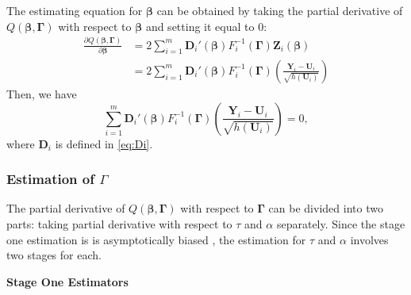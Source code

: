 \documentclass[
]{aft}
\begin{document}
The estimating equation for \(\boldsymbol{\beta}\) can be obtained by
taking the partial derivative of
\(Q(\boldsymbol{\beta}, \boldsymbol{\Gamma})\) with respect to
\(\boldsymbol{\beta}\) and setting it equal to 0: \[
\begin{aligned}
\frac{\partial Q(\boldsymbol{\beta}, \boldsymbol{\Gamma})}{\partial \boldsymbol{\beta}} &= 2 \sum_{i=1}^m \boldsymbol{D}_i'(\boldsymbol{\beta})F_i^{-1}(\boldsymbol{\Gamma})\boldsymbol{Z}_i(\boldsymbol{\beta})\\
&= 2\sum_{i=1}^m \boldsymbol{D}_i'(\boldsymbol{\beta})F_i^{-1}(\boldsymbol{\Gamma})\left(\frac{\boldsymbol{Y}_i - \boldsymbol{U}_i}{\sqrt{h(\boldsymbol{U}_i)}}\right)
\end{aligned}
\] Then, we have \begin{equation}
\sum_{i=1}^m \boldsymbol{D}_i'(\boldsymbol{\beta})F_i^{-1}(\boldsymbol{\Gamma})\left(\frac{\boldsymbol{Y}_i - \boldsymbol{U}_i}{\sqrt{h(\boldsymbol{U}_i)}}\right) = 0, \label{eq:qlsdQdb}
\end{equation} where \(\boldsymbol{D}_i\) is defined in \eqref{eq:Di}.

\subsubsection{\texorpdfstring{Estimation of
\(\Gamma\)}{Estimation of \textbackslash Gamma}}\label{estimation-of-gamma}

The partial derivative of \(Q(\boldsymbol{\beta}, \boldsymbol{\Gamma})\)
with respect to \(\boldsymbol{\Gamma}\) can be divided into two parts:
taking partial derivative with respect to \(\tau\) and \(\alpha\)
separately. Since the stage one estimation is is asymptotically biased
\citep{CHAGANTY1999145}, the estimation for \(\tau\) and \(\alpha\)
involves two stages for each.

\textbf{Stage One Estimators}
\end{document}
